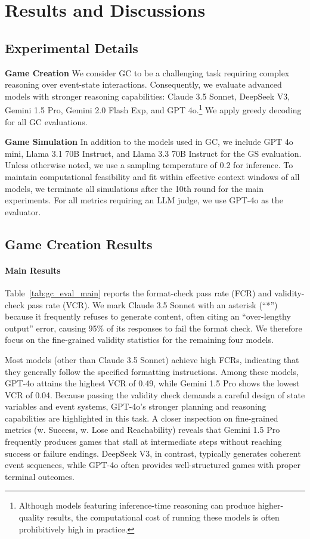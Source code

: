 \section{Results and Discussions}
\subsection{Experimental Details}
\noindent\textbf{Game Creation} We consider GC to be a challenging task requiring complex reasoning over event-state interactions. Consequently, we evaluate advanced models with stronger reasoning capabilities: Claude 3.5 Sonnet, DeepSeek V3, Gemini 1.5 Pro, Gemini 2.0 Flash Exp, and GPT 4o.\footnote{Although models featuring inference-time reasoning can produce higher-quality results, the computational cost of running these models is often prohibitively high in practice.} We apply greedy decoding for all GC evaluations.

\noindent\textbf{Game Simulation} In addition to the models used in GC, we include GPT 4o mini, Llama 3.1 70B Instruct, and Llama 3.3 70B Instruct for the GS evaluation. Unless otherwise noted, we use a sampling temperature of 0.2 for inference. To maintain computational feasibility and fit within effective context windows of all models, we terminate all simulations after the 10th round for the main experiments. For all metrics requiring an LLM judge, we use GPT-4o as the evaluator.


\subsection{Game Creation Results}

\paragraph{Main Results}Table~\ref{tab:gc_eval_main} reports the format-check pass rate (FCR) and validity-check pass rate (VCR). We mark Claude 3.5 Sonnet with an asterisk (``*'') because it frequently refuses to generate content, often citing an “over-lengthy output” error, causing 95\% of its responses to fail the format check. We therefore focus on the fine-grained validity statistics for the remaining four models.

Most models (other than Claude 3.5 Sonnet) achieve high FCRs, indicating that they generally follow the specified formatting instructions. Among these models, GPT-4o attains the highest VCR of 0.49, while Gemini 1.5 Pro shows the lowest VCR of 0.04. Because passing the validity check demands a careful design of state variables and event systems, GPT-4o’s stronger planning and reasoning capabilities are highlighted in this task. A closer inspection on fine-grained metrics (w. Success, w. Lose and Reachability) reveals that Gemini 1.5 Pro frequently produces games that stall at intermediate steps without reaching success or failure endings. DeepSeek V3, in contrast, typically generates coherent event sequences, while GPT-4o often provides well-structured games with proper terminal outcomes.

